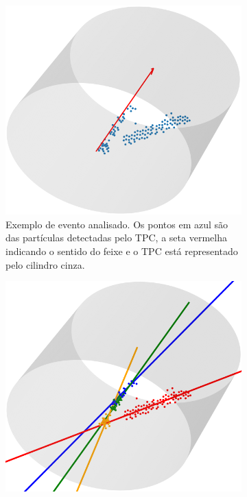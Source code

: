 \documentclass[a4paper,12pt,oneside]{book}
\begin{document}
\begin{figure}[H]
\centering
    \begin{subfigure}[b]{\textwidth}
        \centering
        \includegraphics[scale = 0.4]{figs/clustering_ex_1.png}
        \caption{Exemplo de evento analisado. Os pontos em azul são das partículas detectadas pelo TPC, a seta vermelha indicando o sentido do feixe e o TPC está representado pelo cilindro cinza.}
        \label{subfig:exemplo_1}
    \end{subfigure}%
    \hfill
    \begin{subfigure}[t]{0.45\textwidth}
        \centering
        \includegraphics[scale=0.25, width=.95\columnwidth]{figs/clustering_ex_2.png}

\end{subfigure}
\end{figure}
\end{document}
